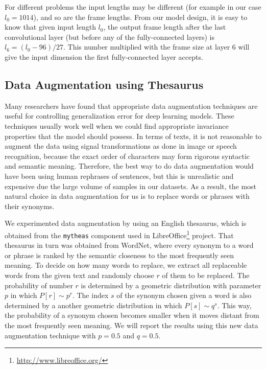 For different problems the input lengths may be different (for example in our case \(l_0 = 1014\)), and so are the frame lengths. From our model design, it is easy to know that given input length \(l_0\), the output frame length after the last convolutional layer (but before any of the fully-connected layers) is \(l_6 = (l_0 - 96) / 27\). This number multiplied with the frame size at layer 6 will give the input dimension the first fully-connected layer accepts.

\subsection{Data Augmentation using Thesaurus}

Many researchers have found that appropriate data augmentation techniques are useful for controlling generalization error for deep learning models. These techniques usually work well when we could find appropriate invariance properties that the model should possess. In terms of texts, it is not reasonable to augment the data using signal transformations as done in image or speech recognition, because the exact order of characters may form rigorous syntactic and semantic meaning. Therefore, the best way to do data augmentation would have been using human rephrases of sentences, but this is unrealistic and expensive due the large volume of samples in our datasets. As a result, the most natural choice in data augmentation for us is to replace words or phrases with their synonyms.

We experimented data augmentation by using an English thesaurus, which is obtained from the \texttt{mytheas} component used in LibreOffice\footnote{\url{http://www.libreoffice.org/}} project. That thesaurus in turn was obtained from WordNet\cite{F05}, where every synonym to a word or phrase is ranked by the semantic closeness to the most frequently seen meaning. To decide on how many words to replace, we extract all replaceable words from the given text and randomly choose \(r\) of them to be replaced. The probability of number \(r\) is determined by a geometric distribution with parameter \(p\) in which \(P[r] \sim p^r\). The index \(s\) of the synonym chosen given a word is also determined by a another geometric distribution in which \(P[s] \sim q^s\). This way, the probability of a synonym chosen becomes smaller when it moves distant from the most frequently seen meaning. We will report the results using this new data augmentation technique with \(p = 0.5\) and \(q = 0.5\).

